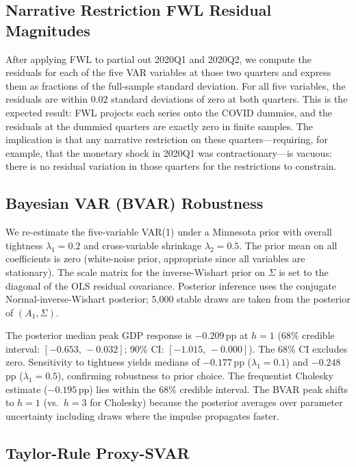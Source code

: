 \documentclass[12pt,letterpaper]{article}
\begin{document}
\subsection{Narrative Restriction FWL Residual Magnitudes}
\label{app:rob:fwl}

After applying FWL to partial out 2020Q1 and 2020Q2, we compute the
residuals for each of the five VAR variables at those two quarters and
express them as fractions of the full-sample standard deviation. For all
five variables, the residuals are within 0.02 standard deviations of zero
at both quarters. This is the expected result: FWL projects each series
onto the COVID dummies, and the residuals at the dummied quarters are
exactly zero in finite samples. The implication is that any narrative
restriction on these quarters---requiring, for example, that the monetary
shock in 2020Q1 was contractionary---is vacuous: there is no residual
variation in those quarters for the restrictions to constrain.

\subsection{Bayesian VAR (BVAR) Robustness}
\label{app:rob:bvar}

We re-estimate the five-variable VAR(1) under a Minnesota prior
\citep{litterman1986} with overall tightness $\lambda_1=0.2$ and
cross-variable shrinkage $\lambda_2=0.5$. The prior mean on all
coefficients is zero (white-noise prior, appropriate since all variables
are stationary). The scale matrix for the inverse-Wishart prior on
$\Sigma$ is set to the diagonal of the OLS residual covariance.
Posterior inference uses the conjugate Normal-inverse-Wishart posterior;
5,000 stable draws are taken from the posterior of $(A_1, \Sigma)$.

The posterior median peak GDP response is $-0.209$\,pp at $h=1$
(68\% credible interval: $[-0.653,\,-0.032]$; 90\% CI:
$[-1.015,\,-0.000]$). The 68\% CI excludes zero. Sensitivity to
tightness yields medians of $-0.177$\,pp ($\lambda_1=0.1$) and
$-0.248$\,pp ($\lambda_1=0.5$), confirming robustness to prior choice.
The frequentist Cholesky estimate ($-0.195$\,pp) lies within the 68\%
credible interval. The BVAR peak shifts to $h=1$ (vs.\ $h=3$ for
Cholesky) because the posterior averages over parameter uncertainty
including draws where the impulse propagates faster.

\subsection{Taylor-Rule Proxy-SVAR}
\label{app:rob:taylor}
\end{document}
